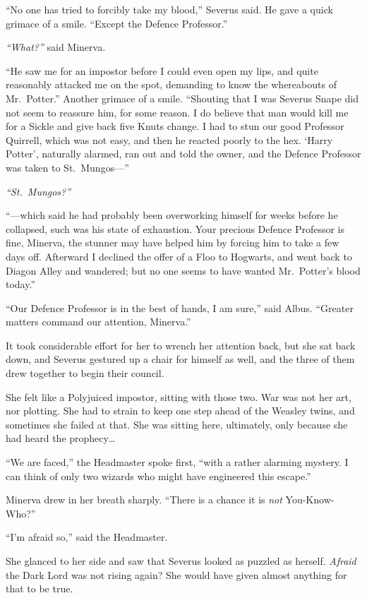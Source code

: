 ``No one has tried to forcibly take my blood,'' Severus said. He gave a
quick grimace of a smile. ``Except the Defence Professor.''

\emph{``What?''} said Minerva.

``He saw me for an impostor before I could even open my lips, and quite
reasonably attacked me on the spot, demanding to know the whereabouts of
Mr.~Potter.'' Another grimace of a smile. ``Shouting that I was Severus
Snape did not seem to reassure him, for some reason. I do believe that
man would kill me for a Sickle and give back five Knuts change. I had to
stun our good Professor Quirrell, which was not easy, and then he
reacted poorly to the hex. `Harry Potter', naturally alarmed, ran out
and told the owner, and the Defence Professor was taken to
St.~Mungos---''

\emph{``St.~Mungos?''}

``---which said he had probably been overworking himself for weeks
before he collapsed, such was his state of exhaustion. Your precious
Defence Professor is fine, Minerva, the stunner may have helped him by
forcing him to take a few days off. Afterward I declined the offer of a
Floo to Hogwarts, and went back to Diagon Alley and wandered; but no one
seems to have wanted Mr.~Potter's blood today.''

``Our Defence Professor is in the best of hands, I am sure,'' said
Albus. ``Greater matters command our attention, Minerva.''

It took considerable effort for her to wrench her attention back, but
she sat back down, and Severus gestured up a chair for himself as well,
and the three of them drew together to begin their council.

She felt like a Polyjuiced impostor, sitting with those two. War was not
her art, nor plotting. She had to strain to keep one step ahead of the
Weasley twins, and sometimes she failed at that. She was sitting here,
ultimately, only because she had heard the prophecy\ldots{}

``We are faced,'' the Headmaster spoke first, ``with a rather alarming
mystery. I can think of only two wizards who might have engineered this
escape.''

Minerva drew in her breath sharply. ``There is a chance it is \emph{not}
You-Know-Who?''

``I'm afraid so,'' said the Headmaster.

She glanced to her side and saw that Severus looked as puzzled as
herself. \emph{Afraid} the Dark Lord was not rising again? She would
have given almost anything for that to be true.

